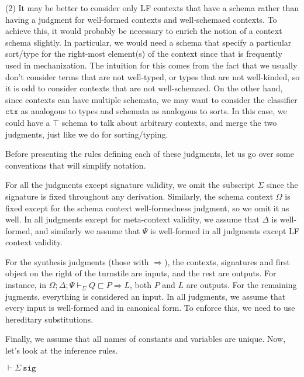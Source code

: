 \documentclass[letterpaper, 11pt]{article}
\newcommand{\Rar}{\Rightarrow}
\newcommand{\sig}{\texttt{sig}}
\begin{document}
    (2) It may be better to consider only LF contexts that have a schema rather than having a judgment for well-formed contexts and well-schemaed contexts.
    To achieve this, it would probably be necessary to enrich the notion of a context schema slightly.  In particular, we would need a schema that
    specify a particular sort/type for the right-most element(s) of the context since that is frequently used in mechanization.  The intuition for this
    comes from the fact that we usually don't consider terms that are not well-typed, or types that are not well-kinded, so it is odd to consider
    contexts that are not well-schemaed.  On the other hand, since contexts can have multiple schemata, we may want to consider the classifier 
    $\texttt{ctx}$ as analogous to types and schemata as analogous to sorts.  In this case, we could have a $\top$ schema to talk about arbitrary contexts,
    and merge the two judgments, just like we do for sorting/typing.

    Before presenting the rules defining each of these judgments, let us go over some conventions that will simplify notation.
    
    For all the judgments except signature validity, we omit the subscript $\Sigma$ since the signature is fixed throughout any derivation.
    Similarly, the schema context $\Omega$ is fixed except for the schema context well-formedness judgment, so we omit it as well.  In all judgments
    except for meta-context validity, we assume that $\Delta$ is well-formed, and similarly we assume that $\Psi$ is well-formed in all judgments
    except LF context validity.  

    For the synthesis judgments (those with $\Rar$), the contexts, signatures and first object on the right of the turnstile
    are inputs, and the rest are outputs.  For instance, in $\Omega; \Delta; \Psi \vdash_\Sigma Q \sqsubset P \Rar L$, both $P$ and $L$ are outputs.
    For the remaining jugments, everything is considered an input.  In all judgments, we assume that every input is well-formed and in canonical form.
    To enforce this, we need to use hereditary substitutions.

    Finally, we assume that all names of constants and variables are unique.  Now, let's look at the inference rules.
    
    $\boxed{\vdash \Sigma \ \sig}$
    
\end{document}
